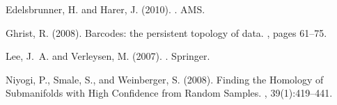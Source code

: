 \begin{thebibliography}{}
{
Edelsbrunner, H. and Harer, J. (2010).
.
\newblock AMS.%
\vspace{-2mm}

Ghrist, R. (2008).
\newblock Barcodes: the persistent topology of data.
, pages 61--75.
\vspace{-2mm}

Lee, J.~A. and Verleysen, M. (2007).
.
\newblock Springer.

Niyogi, P., Smale, S., and Weinberger, S. (2008).
\newblock Finding the {H}omology of {S}ubmanifolds with {H}igh {C}onfidence
  from {R}andom {S}amples.
, 39(1):419--441.

}

\end{thebibliography}
